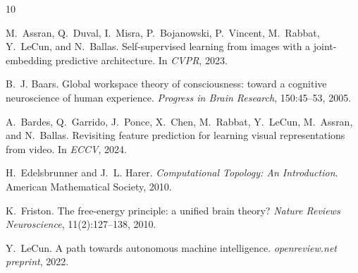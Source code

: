 \documentclass[10pt,twocolumn]{article}
\begin{document}

\begin{thebibliography}{10}

M.~Assran, Q.~Duval, I.~Misra, P.~Bojanowski, P.~Vincent, M.~Rabbat, Y.~LeCun, and N.~Ballas.
\newblock Self-supervised learning from images with a joint-embedding predictive architecture.
\newblock In \emph{CVPR}, 2023.

B.~J. Baars.
\newblock Global workspace theory of consciousness: toward a cognitive neuroscience of human experience.
\newblock \emph{Progress in Brain Research}, 150:45--53, 2005.

A.~Bardes, Q.~Garrido, J.~Ponce, X.~Chen, M.~Rabbat, Y.~LeCun, M.~Assran, and N.~Ballas.
\newblock Revisiting feature prediction for learning visual representations from video.
\newblock In \emph{ECCV}, 2024.

H.~Edelsbrunner and J.~L. Harer.
\newblock \emph{Computational Topology: An Introduction}.
\newblock American Mathematical Society, 2010.

K.~Friston.
\newblock The free-energy principle: a unified brain theory?
\newblock \emph{Nature Reviews Neuroscience}, 11(2):127--138, 2010.

Y.~LeCun.
\newblock A path towards autonomous machine intelligence.
\newblock \emph{openreview.net preprint}, 2022.

\end{thebibliography}
\end{document}
